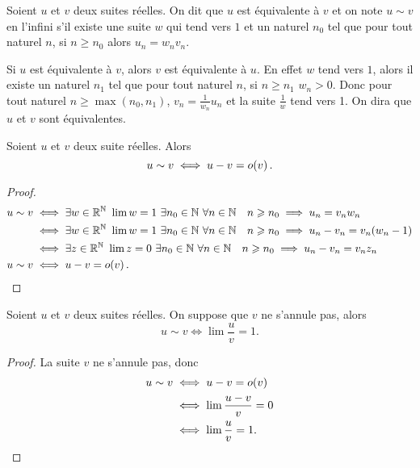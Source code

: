 \begin{defdef}
  Soient \(u\) et \(v\) deux suites réelles. On dit que \(u\) est équivalente à \(v\) et on note \(u \sim v\) en l'infini s'il existe une suite \(w\) qui tend vers \(1\) et un naturel \(n_0\) tel que pour tout naturel \(n\), si \(n \geqslant n_0\) alors \(u_n =w_n v_n\).
\end{defdef}

Si \(u\) est équivalente à \(v\), alors \(v\) est équivalente à \(u\). En effet \(w\) tend vers \(1\), alors il existe un naturel \(n_1\) tel que pour tout naturel \(n\), si \(n \geqslant n_1\) \(w_n >0\). Donc pour tout naturel \(n \geqslant \max(n_0,n_1)\), \(v_n = \frac{1}{w_n} u_n\) et la suite \(\frac{1}{w}\) tend vers 1. On dira que \(u\) et \(v\) sont équivalentes.

\begin{prop}
  Soient \(u\) et \(v\) deux suite réelles. Alors
  \begin{equation}
    u \sim v \iff u-v = o\mathopen{}\left(v\right).
  \end{equation}
\end{prop}
\begin{proof}
  \begin{align}
    u \sim v & \iff \exists w \in \R^\N \ \lim w =1 \ \exists n_0 \in \N \ \forall n \in \N \quad n \geqslant n_0 \implies u_n= v_n w_n \\
    & \iff \exists w \in \R^\N \ \lim w =1 \ \exists n_0 \in \N \ \forall n \in \N \quad n \geqslant n_0 \implies u_n-v_n= v_n (w_n -1) \\
    & \iff \exists z \in \R^\N \ \lim z =0 \ \exists n_0 \in \N \ \forall n \in \N \quad n \geqslant n_0 \implies u_n-v_n= v_n z_n \\
    u \sim v & \iff u-v = \petito{v}.
  \end{align}
\end{proof}
\begin{prop}
  Soient \(u\) et \(v\) deux suites réelles. On suppose que \(v\) ne s'annule pas, alors
  \begin{equation}
    u \sim v \iff \lim \frac{u}{v}=1.
  \end{equation}
\end{prop}
\begin{proof}
  La suite \(v\) ne s'annule pas, donc
  \begin{align}
    u \sim v & \iff u-v = o\mathopen{}\left(v\right) \\
    & \iff \lim \frac{u-v}{v} =0 \\
    & \iff \lim \frac{u}{v} =1.
  \end{align}
\end{proof}
